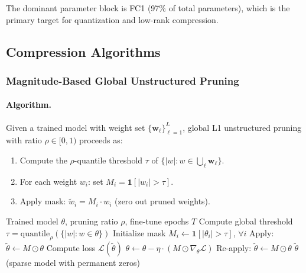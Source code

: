 \noindent The dominant parameter block is FC1 (97\% of total parameters),
which is the primary target for quantization and low-rank compression.

\subsection{Compression Algorithms}
\label{sec:algorithms}

\subsubsection{Magnitude-Based Global Unstructured Pruning}
\label{sec:pruning}

\paragraph{Algorithm.}
Given a trained model with weight set $\{\mathbf{w}_\ell\}_{\ell=1}^L$,
global L1 unstructured pruning with ratio $\rho \in [0,1)$ proceeds as:
\begin{enumerate}[leftmargin=2em,topsep=2pt,itemsep=2pt]
  \item Compute the $\rho$-quantile threshold $\tau$ of
    $\{|w| : w \in \bigcup_\ell \mathbf{w}_\ell\}$.
  \item For each weight $w_i$: set $M_i = \mathbf{1}[|w_i| > \tau]$.
  \item Apply mask: $\tilde{w}_i = M_i \cdot w_i$ (zero out pruned weights).
\end{enumerate}

\begin{algorithm}[h]
\caption{Global L1 Unstructured Pruning with Fine-Tuning}
\label{alg:pruning}
\begin{algorithmic}[1]
\Require Trained model $\theta$, pruning ratio $\rho$, fine-tune epochs $T$
\State Compute global threshold $\tau = \text{quantile}_\rho(\{|w| : w \in \theta\})$
\State Initialize mask $M_i \leftarrow \mathbf{1}[|\theta_i| > \tau]$, $\forall i$
\State Apply: $\tilde\theta \leftarrow M \odot \theta$
              
  \State Compute loss $\mathcal{L}(\tilde\theta)$
  \State $\theta \leftarrow \theta - \eta \cdot (M \odot \nabla_\theta \mathcal{L})$
  \State Re-apply: $\tilde\theta \leftarrow M \odot \theta$
\EndFor
\State \Return $\tilde\theta$ (sparse model with permanent zeros)
\end{algorithmic}
\end{algorithm}

